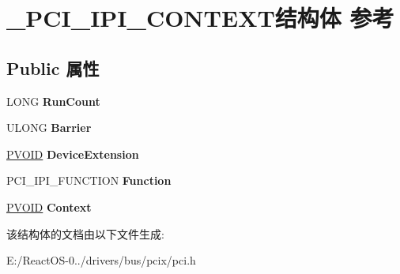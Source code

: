 \hypertarget{struct___p_c_i___i_p_i___c_o_n_t_e_x_t}{}\section{\+\_\+\+P\+C\+I\+\_\+\+I\+P\+I\+\_\+\+C\+O\+N\+T\+E\+X\+T结构体 参考}
\label{struct___p_c_i___i_p_i___c_o_n_t_e_x_t}
\subsection*{Public 属性}
\begin{DoxyCompactItemize}
\item 
\mbox{\label{struct___p_c_i___i_p_i___c_o_n_t_e_x_t_a0e85f6f8c6a1bfbe9fb55619c154fc1b}} 
L\+O\+NG {\bfseries Run\+Count}
\item 
\mbox{\label{struct___p_c_i___i_p_i___c_o_n_t_e_x_t_a52cc191eed8b4643192ee6d8cd1575f4}} 
U\+L\+O\+NG {\bfseries Barrier}
\item 
\mbox{\label{struct___p_c_i___i_p_i___c_o_n_t_e_x_t_ae7edc60539b7dc6df6b73f83b8f5fa27}} 
\hyperlink{interfacevoid}{P\+V\+O\+ID} {\bfseries Device\+Extension}
\item 
\mbox{\label{struct___p_c_i___i_p_i___c_o_n_t_e_x_t_ae4a7181b63378f090dcb1ab4687ffa90}} 
P\+C\+I\+\_\+\+I\+P\+I\+\_\+\+F\+U\+N\+C\+T\+I\+ON {\bfseries Function}
\item 
\mbox{\label{struct___p_c_i___i_p_i___c_o_n_t_e_x_t_aa1e77e26efa1636d6d08c2868a17be7c}} 
\hyperlink{interfacevoid}{P\+V\+O\+ID} {\bfseries Context}
\end{DoxyCompactItemize}


该结构体的文档由以下文件生成\+:\begin{DoxyCompactItemize}
\item 
E\+:/\+React\+O\+S-\/0../drivers/bus/pcix/pci.\+h\end{DoxyCompactItemize}
